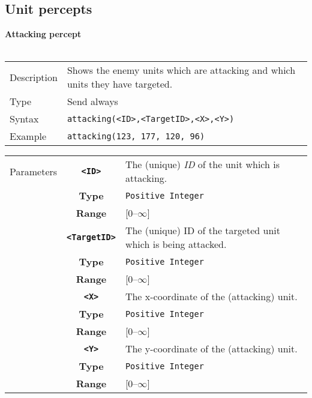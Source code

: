 \subsection{Unit percepts}

\noindent
\textbf{Attacking percept}\\
\\
\begin{tabularx}{\textwidth}{lX}
 Description & Shows the enemy units which are attacking and which units they have targeted. \\
 Type & Send always \\
 Syntax & \verb|attacking(<ID>,<TargetID>,<X>,<Y>)| \\
 Example & \verb|attacking(123, 177, 120, 96)| \\ 
 \end{tabularx}
 \begin{tabularx}{\textwidth}{l | c | p{8cm}|}
 \cline{2-3} 
 Parameters & \textbf{\verb|<ID>|} & The (unique) \textit{ID} of the unit which is attacking. \\
            & \textbf{Type} & \verb|Positive Integer| \\
            & \textbf{Range} & [0--$\infty$] \\
            \cline{2-3} 
            & \textbf{\verb|<TargetID>|} & The (unique) ID of the targeted unit which is being attacked. \\
            & \textbf{Type} & \verb|Positive Integer| \\
            & \textbf{Range} & [0--$\infty$] \\
            \cline{2-3} 
            & \textbf{\verb|<X>|} & The x-coordinate of the (attacking) unit.\\
            & \textbf{Type} & \verb|Positive Integer| \\
            & \textbf{Range} & [0--$\infty$] \\
            \cline{2-3} 
            & \textbf{\verb|<Y>|} & The y-coordinate of the (attacking) unit.\\
            & \textbf{Type} & \verb|Positive Integer| \\
            & \textbf{Range} & [0--$\infty$] \\
            \cline{2-3} 
\end{tabularx} 

